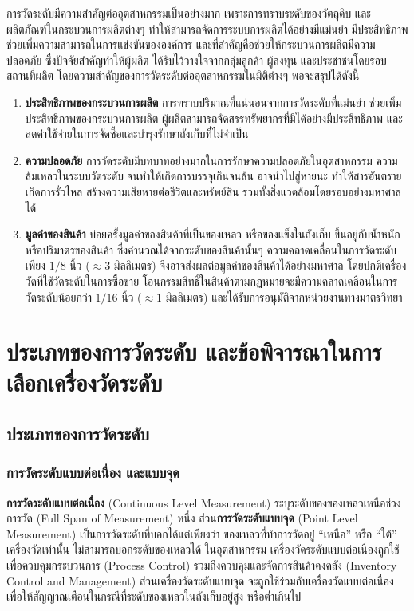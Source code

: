 \documentclass[final,11pt,a4paper]{article}
\begin{document}
การวัดระดับมีความสำคัญต่ออุตสาหกรรมเป็นอย่างมาก เพราะการทราบระดับของวัตถุดิบ และผลิตภัณฑ์ในกระบวนการผลิตต่างๆ
ทำให้สามารถจัดการระบบการผลิตได้อย่างมีแม่นยำ มีประสิทธิภาพ ช่วยเพิ่มความสามารถในการแข่งขันขององค์การ 
และที่สำคัญคือช่วยให้กระบวนการผลิตมีความปลอดภัย ซึ่งปัจจัยสำคัญทำให้ผู้ผลิต ได้รับไว้วางใจจากกลุ่มลูกค้า ผู้ลงทุน และประชาชนโดยรอบสถานที่ผลิต
โดยความสำคัญของการวัดระดับต่ออุตสาหกรรมในมิติต่างๆ พอจะสรุปได้ดังนี้ 
\begin{enumerate}
    \item \textbf{ประสิทธิภาพของกระบวนการผลิต} การทราบปริมาณที่แน่นอนจากการวัดระดับที่แม่นยำ
    ช่วยเพิ่มประสิทธิภาพของกระบวนการผลิต ผู้ผลิตสามารถจัดสรรทรัพยากรที่มีได้อย่างมีประสิทธิภาพ 
    และลดค่าใช้จ่ายในการจัดซื้อและบำรุงรักษาถังเก็บที่ไม่จำเป็น
    \item \textbf{ความปลอดภัย} การวัดระดับมีบทบาทอย่างมากในการรักษาความปลอดภัยในอุตสาหกรรม
    ความล้มเหลวในระบบวัดระดับ จนทำให้เกิดการบรรจุเกินจนล้น อาจนำไปสู่หายนะ ทำให้สารอันตรายเกิดการรั่วไหล
    สร้างความเสียหายต่อชีวิตและทรัพย์สิน รวมทั้งสิ่งแวดล้อมโดยรอบอย่างมหาศาลได้ 
    \item \textbf{มูลค่าของสินค้า} บ่อยครั้งมูลค่าของสินค้าที่เป็นของเหลว หรือของแข็งในถังเก็บ
    ขึ้นอยู่กับน้ำหนัก หรือปริมาตรของสินค้า ซึ่งคำนวณได้จากระดับของสินค้านั้นๆ 
    ความคลาดเคลื่อนในการวัดระดับเพียง $1/8$ นิ้ว ($\approx 3$ มิลลิเมตร) 
    จึงอาจส่งผลต่อมูลค่าของสินค้าได้อย่างมหาศาล โดยปกติเครื่องวัดที่ใช้วัดระดับในการซื้อขาย
    โอนกรรมสิทธิ์ในสินค้าตามกฏหมายจะมีความคลาดเคลื่อนในการวัดระดับน้อยกว่า  $1/16$ นิ้ว ($\approx 1$ มิลลิเมตร)
    และได้รับการอนุมัติจากหน่วยงานทางมาตรวิทยา
\end{enumerate}
\newpage
\section{ประเภทของการวัดระดับ และข้อพิจารณาในการเลือกเครื่องวัดระดับ}
\subsection{ประเภทของการวัดระดับ}
\subsubsection{การวัดระดับแบบต่อเนื่อง และแบบจุด}
\textbf{การวัดระดับแบบต่อเนื่อง} (Continuous Level Measurement) ระบุระดับของของเหลวเหนือช่วงการวัด (Full Span of Measurement)
หนึ่ง ส่วน\textbf{การวัดระดับแบบจุด} (Point Level Measurement) เป็นการวัดระดับที่บอกได้แต่เพียงว่า ของเหลวที่ทำการวัดอยู่ ``เหนือ'' 
หรือ ``ใต้'' เครื่องวัดเท่านั้น ไม่สามารถบอกระดับของเหลวได้ ในอุตสาหกรรม เครื่องวัดระดับแบบต่อเนื่องถูกใช้เพื่อควบคุมกระบวนการ (Process Control)
รวมถึงควบคุมและจัดการสินค้าคงคลัง (Inventory Control and Management) ส่วนเครื่องวัดระดับแบบจุด จะถูกใช้ร่วมกับเครื่องวัดแบบต่อเนื่อง 
เพื่อให้สัญญาณเตือนในกรณีที่ระดับของเหลวในถังเก็บอยู่สูง หรือต่ำเกินไป
\end{document}
